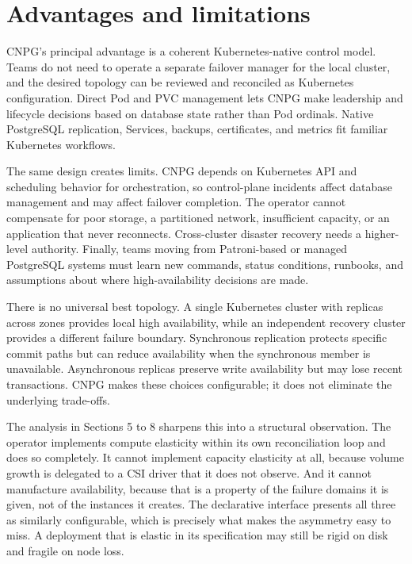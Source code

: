 \documentclass[11pt,a4paper]{article}
\begin{document}
\section{Advantages and limitations}

CNPG's principal advantage is a coherent Kubernetes-native control model. Teams do not need to operate a separate failover manager for the local cluster, and the desired topology can be reviewed and reconciled as Kubernetes configuration. Direct Pod and PVC management lets CNPG make leadership and lifecycle decisions based on database state rather than Pod ordinals. Native PostgreSQL replication, Services, backups, certificates, and metrics fit familiar Kubernetes workflows.

The same design creates limits. CNPG depends on Kubernetes API and scheduling behavior for orchestration, so control-plane incidents affect database management and may affect failover completion. The operator cannot compensate for poor storage, a partitioned network, insufficient capacity, or an application that never reconnects. Cross-cluster disaster recovery needs a higher-level authority. Finally, teams moving from Patroni-based or managed PostgreSQL systems must learn new commands, status conditions, runbooks, and assumptions about where high-availability decisions are made.

There is no universal best topology. A single Kubernetes cluster with replicas across zones provides local high availability, while an independent recovery cluster provides a different failure boundary. Synchronous replication protects specific commit paths but can reduce availability when the synchronous member is unavailable. Asynchronous replicas preserve write availability but may lose recent transactions. CNPG makes these choices configurable; it does not eliminate the underlying trade-offs.

The analysis in Sections 5 to 8 sharpens this into a structural observation. The operator implements compute elasticity within its own reconciliation loop and does so completely. It cannot implement capacity elasticity at all, because volume growth is delegated to a CSI driver that it does not observe. And it cannot manufacture availability, because that is a property of the failure domains it is given, not of the instances it creates. The declarative interface presents all three as similarly configurable, which is precisely what makes the asymmetry easy to miss. A deployment that is elastic in its specification may still be rigid on disk and fragile on node loss.
\end{document}
